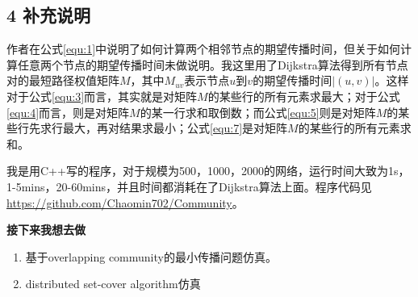 \documentclass[UTF8]{ctexart}
\begin{document}
\subsection*{4 补充说明}
\par 作者在公式\eqref{equ:1}中说明了如何计算两个相邻节点的期望传播时间，但关于如何计算任意两个节点的期望传播时间未做说明。我这里用了Dijkstra算法得到所有节点对的最短路径权值矩阵$M$，其中$M_{uv}$表示节点$u$到$v$的期望传播时间$\left |(u,v) \right |$。这样对于公式\eqref{equ:3}而言，其实就是对矩阵$M$的某些行的所有元素求最大；对于公式\eqref{equ:4}而言，则是对矩阵$M$的某一行求和取倒数；而公式\eqref{equ:5}则是对矩阵$M$的某些行先求行最大，再对结果求最小；公式\eqref{equ:7}是对矩阵$M$的某些行的所有元素求和。
\par 我是用C++写的程序，对于规模为500，1000，2000的网络，运行时间大致为1s，1-5mins，20-60mins，并且时间都消耗在了Dijkstra算法上面。程序代码见\url{https://github.com/Chaomin702/Community}。
\newline
\par \textbf{接下来我想去做}
\begin{enumerate}[\indent 1)]
\item 基于overlapping community的最小传播问题仿真。
\item distributed set-cover algorithm仿真
\end{enumerate}

\par {}
\end{document}
